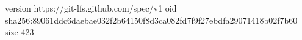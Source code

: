 version https://git-lfs.github.com/spec/v1
oid sha256:89061ddc6daebae032f2b64150f8d3ca082fd7f9f27ebdfa29071418b02f7b60
size 423
